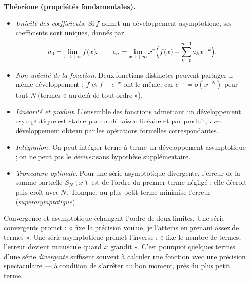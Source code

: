 \begin{tcolorbox}[thmbox]
  \medskip
  \textbf{Théorème (propriétés fondamentales).}
  \begin{itemize}
    \item \textit{Unicité des coefficients.} Si $f$ admet un développement
    asymptotique, ses coefficients sont uniques, donnés par
    \[
      a_0=\lim_{x\to+\infty} f(x),\qquad
      a_n=\lim_{x\to+\infty} x^{n}\Bigl(f(x)-\sum_{k=0}^{n-1}a_k x^{-k}\Bigr).
    \]
    \item \textit{Non-unicité de la fonction.} Deux fonctions distinctes peuvent
    partager le même développement : $f$ et $f+e^{-x}$ ont le même, car
    $e^{-x}=o(x^{-N})$ pour tout $N$ (termes « au-delà de tout ordre »).
    \item \textit{Linéarité et produit.} L'ensemble des fonctions admettant un
    développement asymptotique est stable par combinaison linéaire et par
    produit, avec développement obtenu par les opérations formelles
    correspondantes.
    \item \textit{Intégration.} On peut intégrer terme à terme un développement
    asymptotique ; on ne peut pas le \emph{dériver} sans hypothèse
    supplémentaire.
    \item \textit{Troncature optimale.} Pour une série asymptotique divergente,
    l'erreur de la somme partielle $S_N(x)$ est de l'ordre du premier terme
    négligé ; elle décroît puis croît avec $N$. Tronquer au plus petit terme
    minimise l'erreur (\emph{superasymptotique}).
  \end{itemize}
\end{tcolorbox}

\begin{significationintuitive}
Convergence et asymptotique échangent l'ordre de deux limites. Une série
convergente promet : « fixe la précision voulue, je l'atteins en prenant assez
de termes ». Une série asymptotique promet l'inverse : « fixe le nombre de
termes, l'erreur devient minuscule quand $x$ grandit ». C'est pourquoi quelques
termes d'une série \emph{divergente} suffisent souvent à calculer une fonction
avec une précision spectaculaire — à condition de s'arrêter au bon moment, près
du plus petit terme.
\end{significationintuitive}

\decsep{}



